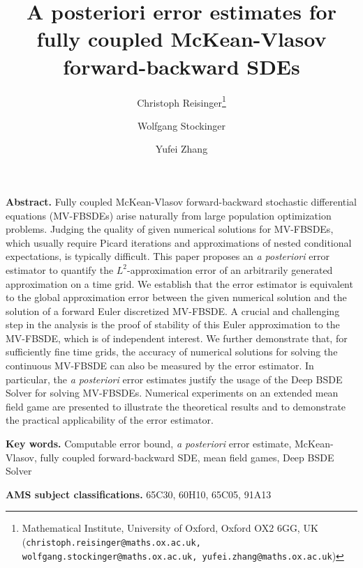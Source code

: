 \documentclass[11pt]{article}
\numberwithin{equation}{section}
\theoremstyle{definition}
\theoremstyle{remark}
\def\ms{\medskip} \def\bs{\bigskip} \def\ss{\smallskip}
\begin{document}
\title{
A posteriori error estimates
for fully coupled 
McKean-Vlasov
forward-backward SDEs
}
%
\author{
Christoph Reisinger\thanks{
Mathematical Institute, University of Oxford, Oxford OX2 6GG, UK
 ({\tt christoph.reisinger@maths.ox.ac.uk, 
wolfgang.stockinger@maths.ox.ac.uk,
yufei.zhang@maths.ox.ac.uk})}
\and
Wolfgang Stockinger\footnotemark[1]
\and
Yufei Zhang\footnotemark[1]
}
\date{}


\maketitle



\noindent\textbf{Abstract.} 
 Fully coupled
 McKean-Vlasov
  forward-backward 
 stochastic differential equations 
 (MV-FBSDEs)
  arise naturally from 
   large population optimization problems.
 Judging the quality of  given numerical solutions
 for MV-FBSDEs,
 which 
 usually require Picard iterations and approximations of  nested conditional expectations,
   is typically difficult.
This paper proposes an \textit{a posteriori} error  estimator 
to quantify the $L^2$-approximation error of an arbitrarily generated 
approximation  on a time grid.
We establish that  
the error estimator   
is equivalent to 
the global approximation error between
 the given numerical solution 
 and the solution of
a forward Euler discretized MV-FBSDE.
A crucial and challenging step in the analysis is the proof of stability of this Euler approximation to the MV-FBSDE, which is of independent interest.
We further demonstrate that,
for  sufficiently fine time grids,
the  accuracy
of numerical solutions
 for solving  the continuous MV-FBSDE
 can also be measured by the  error estimator.
{In particular, the \textit{a posteriori} error  estimates  
 justify the usage of the  Deep BSDE Solver
 for solving 
MV-FBSDEs.
 }
Numerical experiments 
on  an extended mean field game 
are presented to illustrate the theoretical results and to demonstrate the practical applicability of the 
error estimator.
  
 
 
\medskip
\noindent
\textbf{Key words.} 
Computable error bound, \textit{a posteriori} error estimate, 
McKean-Vlasov,  fully coupled forward-backward SDE, 
mean field games,
 Deep BSDE Solver

\ms
\noindent
\textbf{AMS subject classifications.} 65C30, 60H10, 65C05, 91A13  	
\end{document}
